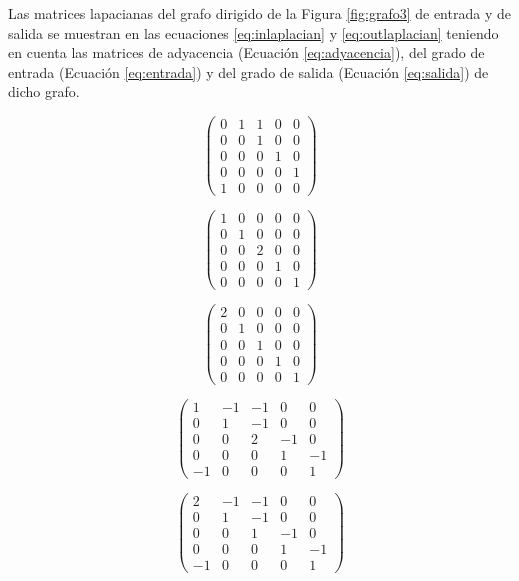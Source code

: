 \begin{exampleth}
Las matrices lapacianas del grafo dirigido de la Figura \ref{fig:grafo3} de entrada y de salida se muestran en las ecuaciones \ref{eq:inlaplacian} y \ref{eq:outlaplacian} teniendo en cuenta las matrices de adyacencia (Ecuación \ref{eq:adyacencia}), del grado de entrada (Ecuación \ref{eq:entrada}) y del grado de salida (Ecuación \ref{eq:salida}) de dicho grafo.

\begin{equation}
\begin{pmatrix}
0 & 1 & 1 & 0 & 0\\
0 & 0 & 1 & 0 & 0\\
0 & 0 & 0 & 1 & 0\\
0 & 0 & 0 & 0 & 1\\
1 & 0 & 0 & 0 & 0
\end{pmatrix}
\label{eq:adyacencia}
\end{equation}

\begin{equation}
\begin{pmatrix}
1 & 0 & 0 & 0 & 0\\
0 & 1 & 0 & 0 & 0\\
0 & 0 & 2 & 0 & 0\\
0 & 0 & 0 & 1 & 0\\
0 & 0 & 0 & 0 & 1
\end{pmatrix}
\label{eq:entrada}
\end{equation}

\begin{equation}
\begin{pmatrix}
2 & 0 & 0 & 0 & 0\\
0 & 1 & 0 & 0 & 0\\
0 & 0 & 1 & 0 & 0\\
0 & 0 & 0 & 1 & 0\\
0 & 0 & 0 & 0 & 1
\end{pmatrix}
\label{eq:salida}
\end{equation}

\begin{equation}
\begin{pmatrix}
1 & -1 & -1 & 0 & 0\\
0 & 1 & -1 & 0 & 0\\
0 & 0 & 2 & -1 & 0\\
0 & 0 & 0 & 1 & -1\\
-1 & 0 & 0 & 0 & 1
\end{pmatrix}
\label{eq:inlaplacian}
\end{equation}

\begin{equation}
\begin{pmatrix}
2 & -1 & -1 & 0 & 0\\
0 & 1 & -1 & 0 & 0\\
0 & 0 & 1 & -1 & 0\\
0 & 0 & 0 & 1 & -1\\
-1 & 0 & 0 & 0 & 1
\end{pmatrix}
\label{eq:outlaplacian}
\end{equation}
\end{exampleth}

